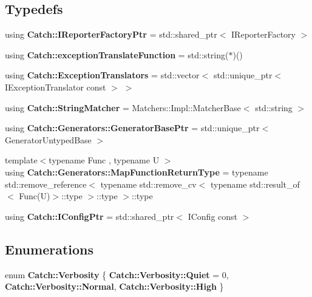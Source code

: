 \subsection*{Typedefs}
\begin{DoxyCompactItemize}
\item 
using \textbf{ Catch\+::\+I\+Reporter\+Factory\+Ptr} = std\+::shared\+\_\+ptr$<$ I\+Reporter\+Factory $>$
\item 
using \textbf{ Catch\+::exception\+Translate\+Function} = std\+::string($\ast$)()
\item 
using \textbf{ Catch\+::\+Exception\+Translators} = std\+::vector$<$ std\+::unique\+\_\+ptr$<$ I\+Exception\+Translator const  $>$ $>$
\item 
using \textbf{ Catch\+::\+String\+Matcher} = Matchers\+::\+Impl\+::\+Matcher\+Base$<$ std\+::string $>$
\item 
using \textbf{ Catch\+::\+Generators\+::\+Generator\+Base\+Ptr} = std\+::unique\+\_\+ptr$<$ Generator\+Untyped\+Base $>$
\item 
{\footnotesize template$<$typename Func , typename U $>$ }\\using \textbf{ Catch\+::\+Generators\+::\+Map\+Function\+Return\+Type} = typename std\+::remove\+\_\+reference$<$ typename std\+::remove\+\_\+cv$<$ typename std\+::result\+\_\+of$<$ Func(U)$>$\+::type $>$\+::type $>$\+::type
\item 
using \textbf{ Catch\+::\+I\+Config\+Ptr} = std\+::shared\+\_\+ptr$<$ I\+Config const  $>$
\end{DoxyCompactItemize}
\subsection*{Enumerations}
\begin{DoxyCompactItemize}
\item 
enum \textbf{ Catch\+::\+Verbosity} \{ \textbf{ Catch\+::\+Verbosity\+::\+Quiet} = 0, 
\textbf{ Catch\+::\+Verbosity\+::\+Normal}, 
\textbf{ Catch\+::\+Verbosity\+::\+High}
 \}
\end{DoxyCompactItemize}
